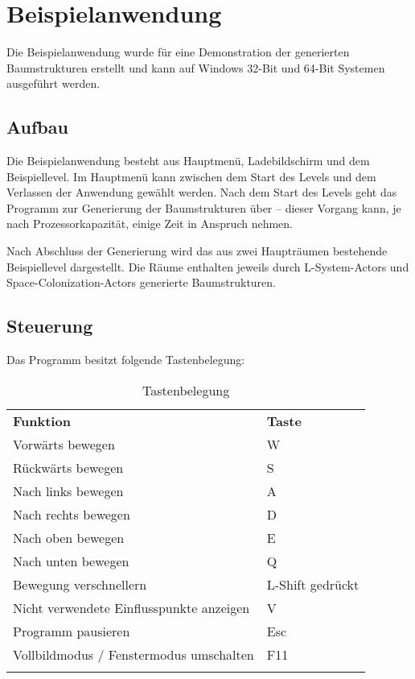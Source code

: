 \section{Beispielanwendung}

Die Beispielanwendung wurde für eine Demonstration der generierten Baumstrukturen erstellt und kann auf Windows 32-Bit und 64-Bit Systemen ausgeführt werden.

\subsection{Aufbau}

Die Beispielanwendung besteht aus Hauptmenü, Ladebildschirm und dem Beispiellevel. Im Hauptmenü kann zwischen dem Start des Levels und dem Verlassen der Anwendung gewählt werden. Nach dem Start des Levels geht das Programm zur Generierung der Baumstrukturen über -- dieser Vorgang kann, je nach Prozessorkapazität, einige Zeit in Anspruch nehmen.

Nach Abschluss der Generierung wird das aus zwei Haupträumen bestehende Beispiellevel dargestellt. Die Räume enthalten jeweils durch L-System-Actors und Space-Colonization-Actors generierte Baumstrukturen.

\subsection{Steuerung}

Das Programm besitzt folgende Tastenbelegung: \\

\begin{longtabu} to \textwidth {|X[4,l] | X[2,c]|}
	\everyrow {\tabucline [1pt]{-}} 
	\tabucline [1pt]{-}
	\textbf{Funktion} & \textbf{Taste}  \\
	Vorwärts bewegen & W\\
	
	Rückwärts bewegen & S\\
	
	Nach links bewegen & A\\
	
	Nach rechts bewegen & D\\
	
	Nach oben bewegen & E \\
	
	Nach unten bewegen & Q \\
	
	Bewegung verschnellern & L-Shift gedrückt \\
	
	Nicht verwendete Einflusspunkte anzeigen & V \\
	
	Programm pausieren & Esc \\
	
	Vollbildmodus / Fenstermodus umschalten & F11 \\
	
	\caption{Tastenbelegung}   	  
\end{longtabu}


